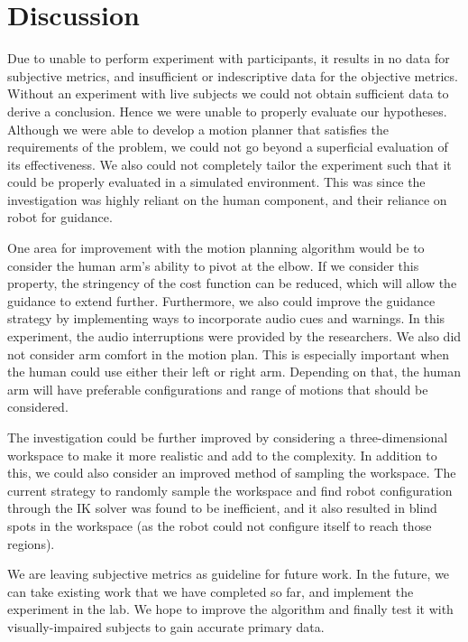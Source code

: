 \section{Discussion}
Due to unable to perform experiment with participants, it results in no data for subjective metrics, and insufficient or indescriptive data for the objective metrics. 
Without an experiment with live subjects we could not obtain sufficient data to derive a conclusion. 
Hence we were unable to properly evaluate our hypotheses. 
Although we were able to develop a motion planner that satisfies the requirements of the problem, we could not go beyond a superficial evaluation of its effectiveness. 
We also could not completely tailor the experiment such that it could be properly evaluated in a simulated environment. 
This was since the investigation was highly reliant on the human component, and their reliance on robot for guidance. 

One area for improvement with the motion planning algorithm would be to consider the human arm's ability to pivot at the elbow. 
If we consider this property, the stringency of the cost function can be reduced, which will allow the guidance to extend further. 
Furthermore, we also could improve the guidance strategy by implementing ways to incorporate audio cues and warnings. 
In this experiment, the audio interruptions were provided by the researchers. 
We also did not consider arm comfort in the motion plan. 
This is especially important when the human could use either their left or right arm. 
Depending on that, the human arm will have preferable configurations and range of motions that should be considered.

The investigation could be further improved by considering a three-dimensional workspace to make it more realistic and add to the complexity. 
In addition to this, we could also consider an improved method of sampling the workspace. 
The current strategy to randomly sample the workspace and find robot configuration through the IK solver was found to be inefficient, and it also resulted in blind spots in the workspace (as the robot could not configure itself to reach those regions). 

We are leaving subjective metrics as guideline for future work. 
In the future, we can take existing work that we have completed so far, and implement the experiment in the lab. 
We hope to improve the algorithm and finally test it with visually-impaired subjects to gain accurate primary data. 

